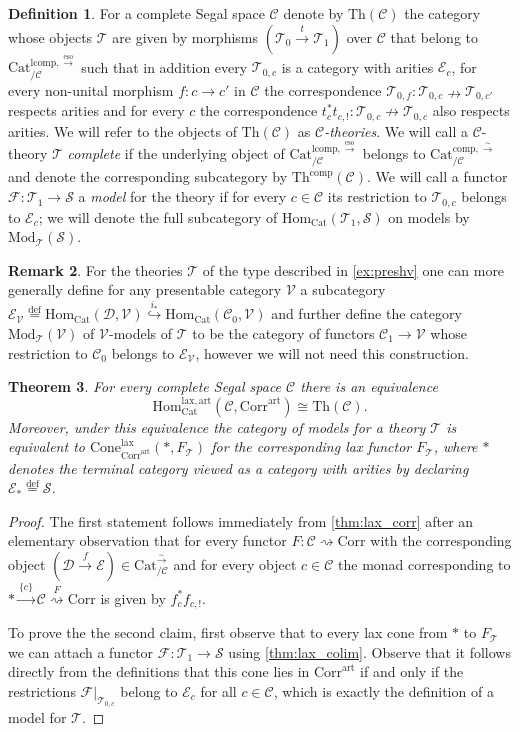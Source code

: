 \documentclass[a4paper, reqno]{amsart}
\newtheorem{theorem}{Theorem}[section]
\theoremstyle{definition}
\newtheorem{defn}[theorem]{Definition}
\newtheorem{remark}[theorem]{Remark}
\newcommand\cC{\mathscr C}
\newcommand\cD{\mathscr D}
\newcommand\cE{\mathscr E}
\newcommand\cF{\mathscr F}
\newcommand\cS{\mathscr S}
\newcommand\cT{\mathscr T}
\newcommand\cV{\mathscr V}
\newcommand\art{\mathrm{art}}
\newcommand\mor{\mathrm{Hom}}
\newcommand\cat{\mathrm{Cat}}
\newcommand\comp{\mathrm{comp}}
\newcommand\lcomp{\mathrm{lcomp}}
\newcommand\thr{\mathrm{Th}}
\newcommand\bydef{\overset{\mathrm{def}}{=}}
\newcommand\corr{\mathrm{Corr}}
\newcommand\modl{\mathrm{Mod}}
\newcommand\lax{\mathrm{lax}}
\newcommand\con{\mathrm{Cone}}
\newcommand\wrr{{\overset{\sim}{\rightarrow}}}
\newcommand\eso{\mathrm{eso}}
\begin{document}
\begin{defn}\label{def:thr}
For a complete Segal space $\cC$ denote by $\thr(\cC)$ the category whose objects $\cT$ are given by morphisms $(\cT_0\xrightarrow{t}\cT_1)$ over $\cC$ that belong to $\cat^{\lcomp,\overset{\eso}{\rightarrow}}_{/\cC}$ such that in addition every $\cT_{0,c}$ is a category with arities $\cE_c$, for every non-unital morphism $f:c\rightarrow c'$ in $\cC$ the correspondence $\cT_{0,f}:\cT_{0,c}\nrightarrow\cT_{0,c'}$ respects arities and for every $c$ the correspondence $t_c^* t_{c,!}:\cT_{0,c}\nrightarrow\cT_{0,c}$ also respects arities. We will refer to the objects of $\thr(\cC)$ as \textit{$\cC$-theories}. We will call a $\cC$-theory $\cT$ \textit{complete} if the underlying object of $\cat^{\lcomp,\overset{\eso}{\rightarrow}}_{/\cC}$ belongs to $\cat^{\comp,\wrr}_{/\cC}$ and denote the corresponding subcategory by $\thr^\comp(\cC)$. We will call a functor $\cF:\cT_1\rightarrow\cS$ a \textit{model} for the theory if for every $c\in\cC$ its restriction to $\cT_{0,c}$ belongs to $\cE_c$; we will denote the full subcategory of $\mor_\cat(\cT_1,\cS)$ on models by $\modl_\cT(\cS)$.
\end{defn}
\begin{remark}
For the theories $\cT$ of the type described in \cref{ex:preshv} one can more generally define for any presentable category $\cV$ a subcategory $\cE_\cV\bydef\mor_\cat(\cD,\cV)\overset{i_*}{\hookrightarrow}\mor_\cat(\cC_0,\cV)$ and further define the category $\modl_\cT(\cV)$ of $\cV$-models of $\cT$ to be the category of functors $\cC_1\rightarrow \cV$ whose restriction to $\cC_0$ belongs to $\cE_\cV$, however we will not need this construction.
\end{remark}
\begin{theorem}\label{thm:art}
For every complete Segal space $\cC$ there is an equivalence 
\[\mor^{\lax,\art}_\cat(\cC,\corr^\art)\cong\thr(\cC).\]
Moreover, under this equivalence the category of models for a theory $\cT$ is equivalent to $\con_{\corr^\art}^\lax(*,F_\cT)$ for the corresponding lax functor $F_\cT$, where $*$ denotes the terminal category viewed as a category with arities by declaring $\cE_*\bydef \cS$.
\end{theorem}
\begin{proof}
The first statement follows immediately from \cref{thm:lax_corr} after an elementary observation that for every functor $F:\cC\rightsquigarrow\corr$ with the corresponding object $(\cD\xrightarrow{f}\cE)\in\cat^\wrr_{/\cC}$ and for every object $c\in\cC$ the monad corresponding to $*\xrightarrow{\{c\}}\cC\overset{F}{\rightsquigarrow}\corr$ is given by $f_c^*f_{c,!}$.\par
To prove the the second claim, first observe that to every lax cone from $*$ to $F_\cT$ we can attach a functor $\cF:\cT_1\rightarrow\cS$ using \cref{thm:lax_colim}. Observe that it follows directly from the definitions that this cone lies in $\corr^\art$ if and only if the restrictions $\cF|_{\cT_{0,c}}$ belong to $\cE_c$ for all $c\in\cC$, which is exactly the definition of a model for $\cT$.
\end{proof}
\end{document}
